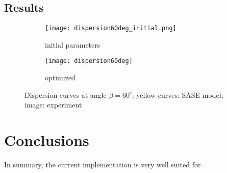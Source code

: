 \documentclass[preprint,12pt]{elsarticle}
\begin{document}
	\subsection{Results}
	\begin{figure} [h!]
		\centering
		\begin{subfigure}[b]{\textwidth}
			\centering
			\texttt{[image: dispersion60deg\_initial.png]}
			\caption{initial parameters}
			\label{fig:dispersion60deg_initial}
		\end{subfigure}
		\begin{subfigure}[b]{\textwidth}
			\centering
			\texttt{[image: dispersion60deg]}
			\caption{optimized}
			\label{fig:dispersion60deg}
		\end{subfigure}
	\caption{Dispersion curves at angle $\beta = 60^{\circ}$; yellow curves: SASE model; image: experiment }
	\label{fig:initial_optimized}
	\end{figure}
\clearpage
	\section{Conclusions}

	
	In summary, the current implementation is very well suited for 
	 
	\appendix
\end{document}
